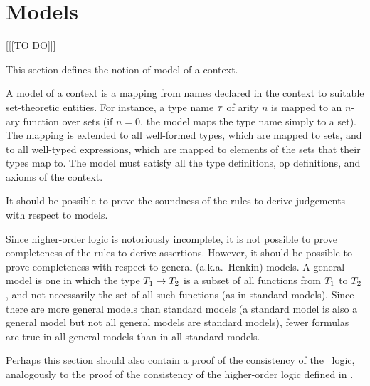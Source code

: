 \section{Models}
\label{models}

[[[TO DO]]]

This section defines the notion of model of a context.

A model of a context is a mapping from names declared in the context to
suitable set-theoretic entities. For instance, a type name $\tau$ of arity
$n$ is mapped to an $n$-ary function over sets (if $n=0$, the model maps the
type name simply to a set). The mapping is extended to all well-formed types,
which are mapped to sets, and to all well-typed expressions, which are mapped
to elements of the sets that their types map to. The model must satisfy all
the type definitions, op definitions, and axioms of the context.

It should be possible to prove the soundness of the rules to derive judgements
with respect to models.

Since higher-order logic is notoriously incomplete, it is not possible to
prove completeness of the rules to derive assertions. However, it should be
possible to prove completeness with respect to general (a.k.a.\ Henkin)
models. A general model is one in which the type $T_1\to T_2$ is a subset of all
functions from $T_1$ to $T_2$, and not necessarily the set of all such
functions (as in standard models). Since there are more general models than
standard models (a standard model is also a general model but not all general
models are standard models), fewer formulas are true in all general models
than in all standard models.

Perhaps this section should also contain a proof of the consistency of the
\MS\ logic, analogously to the proof of the consistency of the higher-order
logic defined in \cite{andrews}.
